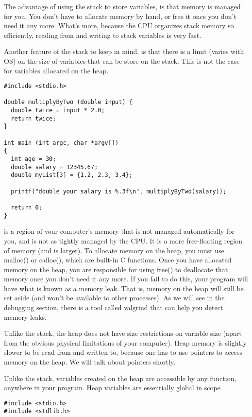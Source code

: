 \documentclass[9pt]{amsart}
\begin{document}
\begin{multicols}{2}
The advantage of using the stack to store variables, is that memory is managed for you. You don't have to allocate memory by hand, or free it once you don't need it any more. What's more, because the CPU organizes stack memory so efficiently, reading from and writing to stack variables is very fast. 

Another feature of the stack to keep in mind, is that there is a limit (varies with OS) on the size of variables that can be store on the stack. This is not the case for variables allocated on the heap.

\begin{lstlisting}
#include <stdio.h>

double multiplyByTwo (double input) {
  double twice = input * 2.0;
  return twice;
}

int main (int argc, char *argv[])
{
  int age = 30;
  double salary = 12345.67;
  double myList[3] = {1.2, 2.3, 3.4};

  printf("double your salary is %.3f\n", multiplyByTwo(salary));

  return 0;
}
\end{lstlisting}

\noindent {\textcolor {blue} {\em Heap}} 
 is a region of your computer's memory that is not managed automatically for you, and is not as tightly managed by the CPU. It is a more free-floating region of memory (and is larger). To allocate memory on the heap, you must use malloc() or calloc(), which are built-in C functions. Once you have allocated memory on the heap, you are responsible for using free() to deallocate that memory once you don't need it any more. If you fail to do this, your program will have what is known as a memory leak. That is, memory on the heap will still be set aside (and won't be available to other processes). As we will see in the debugging section, there is a tool called valgrind that can help you detect memory leaks.

Unlike the stack, the heap does not have size restrictions on variable size (apart from the obvious physical limitations of your computer). Heap memory is slightly slower to be read from and written to, because one has to use pointers to access memory on the heap. We will talk about pointers shortly.

Unlike the stack, variables created on the heap are accessible by any function, anywhere in your program. Heap variables are essentially global in scope.

\begin{lstlisting}
#include <stdio.h>
#include <stdlib.h>


\end{lstlisting}
\end{multicols}
\end{document}
